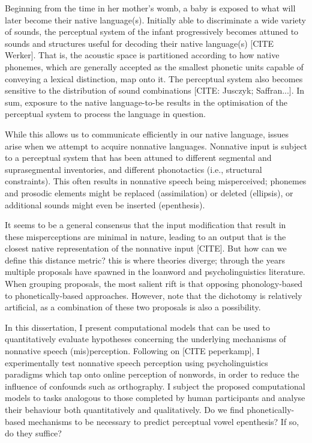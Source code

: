 

Beginning from the time in her mother's womb, a baby is exposed to what will later become their native language(s). Initially able to discriminate a wide variety of sounds, the perceptual system of the infant progressively becomes attuned to sounds and structures useful for decoding their native language(s) [CITE Werker]. That is, the acoustic space is partitioned according to how native phonemes, which are generally accepted as the smallest phonetic units capable of conveying a lexical distinction, map onto it. The perceptual system also becomes sensitive to the distribution of sound combinations [CITE: Jusczyk; Saffran...]. In sum, exposure to the native language-to-be results in the optimisation of the perceptual system to process the language in question.

While this allows us to communicate efficiently in our native language, issues arise when we attempt to acquire nonnative languages. Nonnative input is subject to a perceptual system that has been attuned to different segmental and suprasegmental inventories, and different phonotactics (i.e., structural constraints). This often results in nonnative speech being misperceived; phonemes and prosodic elements might be replaced (assimilation) or deleted (ellipsis), or additional sounds might even be inserted (epenthesis).

It seems to be a general consensus that the input modification that result in these misperceptions are minimal in nature, leading to an output that is the closest native representation of the nonnative input [CITE]. But how can we define this distance metric? this is where theories diverge; through the years multiple proposals have spawned in the loanword and psycholinguistics literature. When grouping proposals, the most salient rift is that opposing phonology-based to phonetically-based approaches. However, note that the dichotomy is relatively artificial, as a combination of these two proposals is also a possibility.

In this dissertation, I present computational models that can be used to quantitatively evaluate hypotheses concerning the underlying mechanisms of nonnative speech (mis)perception. Following on [CITE peperkamp], I experimentally test nonnative speech perception using psycholinguistics paradigms which tap onto online perception of nonwords, in order to reduce the influence of confounds such as orthography. I subject the proposed computational models to tasks analogous to those completed by human participants and analyse their behaviour both quantitatively and qualitatively. Do we find phonetically-based mechanisms to be necessary to predict perceptual vowel epenthesis? If so, do they suffice? 


